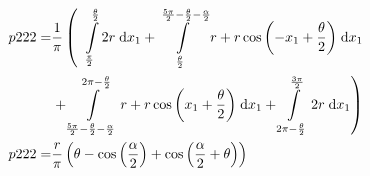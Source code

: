 \begin{align}
    p222 =&\frac{1}{\pi} \left(\;\;\int\limits_{\frac{\pi}{2}}^{\frac{\theta}{2}}2 r\;\mathrm{d}x_{1}+\int\limits_{\frac{\theta}{2}}^{\frac{5 \pi}{2} - \frac{\theta}{2} - \frac{\alpha}{2}}r + r \cos{\left (- x_{1} + \frac{\theta}{2} \right )}\;\mathrm{d}x_{1}\right.\notag\\
 &\left.+\int\limits_{\frac{5 \pi}{2} - \frac{\theta}{2} - \frac{\alpha}{2}}^{2 \pi - \frac{\theta}{2}}r + r \cos{\left (x_{1} + \frac{\theta}{2} \right )}\;\mathrm{d}x_{1}+\int\limits_{2 \pi - \frac{\theta}{2}}^{\frac{3 \pi}{2}}2 r\;\mathrm{d}x_{1}\right)\label{p222Def}\\
    p222 =& \frac{r}{\pi} \left(\theta - \cos{\left (\frac{\alpha}{2} \right )} + \cos{\left (\frac{\alpha}{2} + \theta \right )}\right)\label{p222Sln}
\end{align}